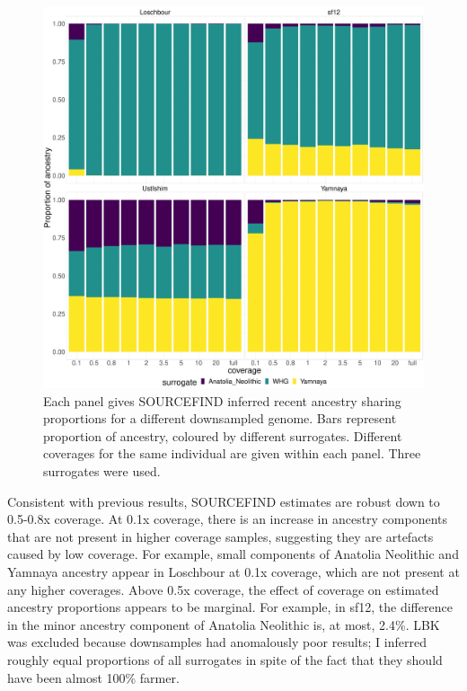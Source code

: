 {\begin{figure}[htp]
    \centering
    \includegraphics[width=1.0\textwidth]{../images/chapter1/3pop_SF_downsampled.pdf}
    \caption{Each panel gives SOURCEFIND inferred recent ancestry sharing proportions for a different downsampled genome. Bars represent proportion of ancestry, coloured by different surrogates. Different coverages for the same individual are given within each panel. Three surrogates were used.}
    \label{fig:3pop_SF_downsampled}
\end{figure}

Consistent with previous results, SOURCEFIND estimates are robust down to 0.5-0.8x coverage. At 0.1x coverage, there is an increase in ancestry components that are not present in higher coverage samples, suggesting they are artefacts caused by low coverage. For example, small components of Anatolia Neolithic and Yamnaya ancestry appear in Loschbour at 0.1x coverage, which are not present at any higher coverages. Above 0.5x coverage, the effect of coverage on estimated ancestry proportions appears to be marginal. For example, in sf12, the difference in the minor ancestry component of Anatolia Neolithic is, at most, 2.4\%. LBK was excluded because downsamples had anomalously poor results; I inferred roughly equal proportions of all surrogates in spite of the fact that they should have been almost 100\% farmer. 

}
